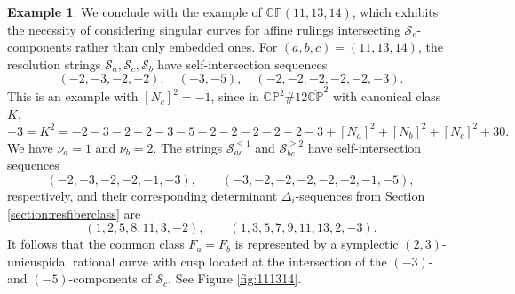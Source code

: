 \documentclass[11pt]{article}
\theoremstyle{definition}
\newtheorem{example}[theorem]{Example}
\theoremstyle{remark}
\newcommand{\CP}{\mathbb{CP}}
\newcommand{\st}{\mathcal{S}}
\begin{document}
\begin{example}
  We conclude with the example of $\CP(11,13,14)$, which exhibits the necessity of considering singular curves for affine rulings intersecting $\st_c$-components rather than only embedded ones. For $(a,b,c)=(11,13,14)$, the resolution strings $\st_a,\st_c,\st_b$ have self-intersection sequences
  \[(-2,-3,-2,-2),\quad (-3,-5),\quad (-2,-2,-2,-2,-2,-3).\]
This is an example with $[N_c]^2=-1$, since in $\CP^2\#12\overline{\CP}^2$ with canonical class $K$,
\[-3=K^2=-2-3-2-2-3-5-2-2-2-2-2-3+[N_a]^2+[N_b]^2+[N_c]^2+30.\]
We have $\nu_a=1$ and $\nu_b=2$. The strings $\st_{ac}^{\leq 1}$ and $\st_{bc}^{\geq 2}$ have self-intersection sequences
\[(-2,-3,-2,-2,-1,-3),\qquad (-3,-2,-2,-2,-2,-2,-1,-5),\]
respectively, and their corresponding determinant $\Delta_i$-sequences from Section \ref{section:resfiberclass} are
\[(1,2,5,8,11,3,-2),\qquad (1,3,5,7,9,11,13,2,-3).\]
It follows that the common class $F_a=F_b$ is represented by a symplectic $(2,3)$-unicuspidal rational curve with cusp located at the intersection of the $(-3)$- and $(-5)$-components of $\st_c$. See Figure \ref{fig:111314}.
\end{example}
\end{document}
